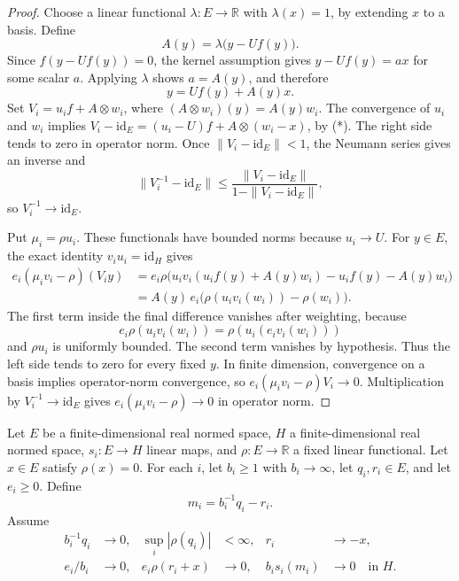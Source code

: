 \begin{proof}
Choose a linear functional $\lambda:E\to\mathbb R$ with $\lambda(x)=1$,
by extending $x$ to a basis. Define
\[
 A(y)=\lambda\bigl(y-Uf(y)\bigr).
\]
Since $f(y-Uf(y))=0$, the kernel assumption gives
$y-Uf(y)=a x$ for some scalar $a$. Applying $\lambda$ shows $a=A(y)$,
and therefore
\begin{equation}
 y=Uf(y)+A(y)x. \label{eq:trace-weighted-estimates-display-star}
\end{equation}
Set $V_i=u_i f+A\otimes w_i$, where
$(A\otimes w_i)(y)=A(y)w_i$. The convergence of $u_i$ and $w_i$ implies
$V_i-\mathrm{id}_E=(u_i-U)f+A\otimes(w_i-x)$, by (*). The right side
tends to zero in operator norm. Once $\|V_i-\mathrm{id}_E\|<1$, the
Neumann series gives an inverse and
\[
 \|V_i^{-1}-\mathrm{id}_E\|
 \leq \frac{\|V_i-\mathrm{id}_E\|}{1-\|V_i-\mathrm{id}_E\|},
\]
so $V_i^{-1}\to\mathrm{id}_E$.

Put $\mu_i=\rho u_i$. These functionals have bounded norms because
$u_i\to U$. For $y\in E$, the exact identity $v_i u_i=\mathrm{id}_H$
gives
\begin{align*}
 e_i(\mu_i v_i-\rho)(V_i y)
 &=e_i\rho\bigl(u_i v_i(u_i f(y)+A(y)w_i)-u_i f(y)-A(y)w_i\bigr)\\
 &=A(y)\,e_i\bigl(\rho(u_i v_i(w_i))-\rho(w_i)\bigr).
\end{align*}
The first term inside the final difference vanishes after weighting,
because
\[
 e_i\rho(u_i v_i(w_i))=\rho(u_i(e_i v_i(w_i)))
\]
and $\rho u_i$ is uniformly bounded. The second term vanishes by hypothesis. Thus the
left side tends to zero for every fixed $y$. In finite dimension,
convergence on a basis implies operator-norm convergence, so
$e_i(\mu_i v_i-\rho)V_i\to0$. Multiplication by
$V_i^{-1}\to\mathrm{id}_E$ gives
$e_i(\mu_i v_i-\rho)\to0$ in operator norm.
\end{proof}

Let $E$ be a finite-dimensional real normed space, $H$ a finite-dimensional
real normed space, $s_i:E\to H$ linear maps, and $\rho:E\to\mathbb R$ a
fixed linear functional. Let $x\in E$ satisfy $\rho(x)=0$. For each $i$,
let $b_i\ge1$ with $b_i\to\infty$, let $q_i,r_i\in E$, and let
$e_i\ge0$. Define
\[
 m_i=b_i^{-1}q_i-r_i.
\]
Assume
\begin{align}
 b_i^{-1}q_i&\longrightarrow0,
 &\sup_i|\rho(q_i)|&<\infty,
 &r_i&\longrightarrow -x,
 \label{eq:ex-lattice-trace-response-limit}\\
 e_i/b_i&\longrightarrow0,
 &e_i\rho(r_i+x)&\longrightarrow0,
 &b_i s_i(m_i)&\longrightarrow0\quad\text{in }H.
 \label{eq:ex-lattice-trace-response-weighted}
\end{align}

